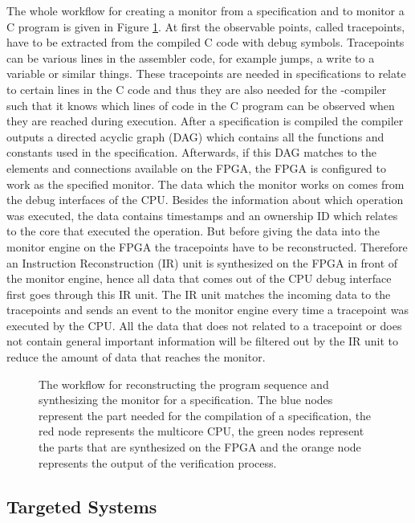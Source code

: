 The whole workflow for creating a monitor from a \tessla specification and to monitor a C program is given in Figure \ref{fig:workflow}. At first the observable points, called tracepoints, have to be extracted from the compiled C code with debug symbols. Tracepoints can be various lines in the assembler code, for example jumps, a write to a variable or similar things. These tracepoints are needed in \tessla specifications to relate to certain lines in the C code and thus they are also needed for the \tessla-compiler such that it knows which lines of code in the C program can be observed when they are reached during execution. After a \tessla specification is compiled the compiler outputs a directed acyclic graph (DAG) which contains all the functions and constants used in the specification. Afterwards, if this DAG matches to the elements and connections available on the FPGA, the FPGA is configured to work as the specified monitor. The data which the monitor works on comes from the debug interfaces of the CPU. Besides the information about which operation was executed, the data contains timestamps and an ownership ID which relates to the core that executed the operation. But before giving the data into the monitor engine on the FPGA the tracepoints have to be reconstructed. Therefore an Instruction Reconstruction (IR) unit is synthesized on the FPGA in front of the monitor engine, hence all data that comes out of the CPU debug interface first goes through this IR unit. The IR unit matches the incoming data to the tracepoints and sends an event to the monitor engine every time a tracepoint was executed by the CPU. All the data that does not related to a tracepoint or does not contain general important information will be filtered out by the IR unit to reduce the amount of data that reaches the monitor.

\begin{figure}
	
	\caption{The workflow for reconstructing the program sequence and synthesizing the monitor for a \tessla specification. The blue nodes represent the part needed for the compilation of a \tessla specification, the red node represents the multicore CPU, the green nodes represent the parts that are synthesized on the FPGA and the orange node represents the output of the verification process. \label{fig:workflow}}
\end{figure}

\subsection{Targeted Systems}

